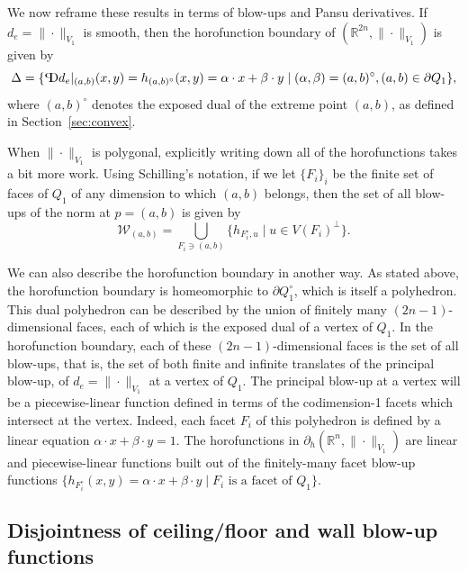 \documentclass{article}
\theoremstyle{definition}
\newcommand{\norm}[1]{\|#1\|}
\newcommand{\bhor}{\partial_h}
\newcommand{\pD}{\text{\scalebox{-1}[1]{$\mathrm{P}$}\!\!$\mathrm{D}$}}
\newcommand{\R}{{\mathbb R}}
\begin{document}
We now reframe these results in terms of blow-ups and Pansu derivatives. If $d_e = \norm{\cdot}_{V_1}$ is smooth, then the horofunction boundary of $(\R^{2n},\norm{\cdot}_{V_1})$ is given by
\[\Delta = \{\pD d_e\vert_{(a,b)}(x,y) = h_{(a,b)^\circ}(x,y) = \alpha\cdot x + \beta \cdot y \mid (\alpha, \beta) = (a,b)^\circ, (a,b) \in \partial Q_1\},
\]
where $(a,b)^\circ$ denotes the exposed dual of the extreme point $(a,b)$, as defined in Section~\ref{sec:convex}.

When $\norm{\cdot}_{V_1}$ is polygonal, explicitly writing down all of the horofunctions takes a bit more work. Using Schilling's notation, if we let $\{F_i\}_i$ be the finite set of faces of $Q_1$ of any dimension to which $(a,b)$ belongs, then the set of all blow-ups of the norm at $p= (a,b)$ is given by
\[\mathcal W_{(a,b)} = \bigcup_{F_i \ni (a,b)}\{h_{F_i^\circ, u}\mid u \in V(F_i)^\perp \}.
\]

We can also describe the horofunction boundary in another way. As stated above, the horofunction boundary is homeomorphic to $\partial Q_1^\circ$, which is itself a polyhedron. This dual polyhedron can be described by the union of finitely many $(2n-1)$-dimensional faces, each of which is the exposed dual of a vertex of $Q_1$. In the horofunction boundary, each of these $(2n-1)$-dimensional faces is the set of all blow-ups, that is, the set of both finite and infinite translates of the principal blow-up, of $d_e = \norm{\cdot}_{V_1}$ at a vertex of $Q_1$. 
The principal blow-up at a vertex will be a piecewise-linear function defined in terms of the codimension-1 facets which intersect at the vertex. Indeed, each facet $F_i$  of this polyhedron is defined by a linear equation $\alpha \cdot x + \beta \cdot y = 1$. The horofunctions in $\bhor (\R^n, \norm{\cdot}_{V_1})$ are linear and piecewise-linear functions built out of the finitely-many facet blow-up functions $\{h_{F_i^\circ}(x,y) = \alpha \cdot x + \beta \cdot y\mid F_i \text{ is a facet of } Q_1\}.$ 

\subsection{Disjointness of ceiling/floor and wall blow-up functions}\label{sec:degenerate}
\end{document}
